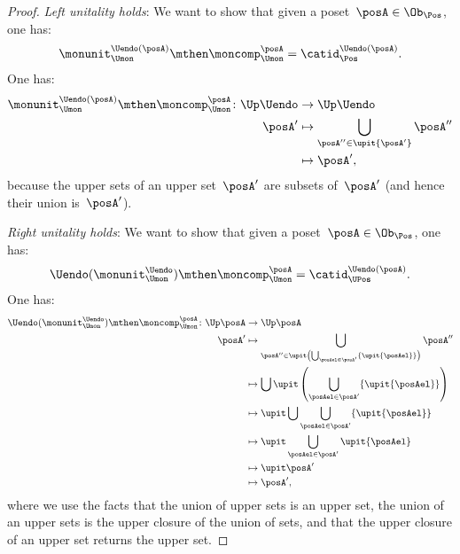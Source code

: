 \begin{proof}
  \emph{Left unitality holds}: We want to show that given a poset~$\posA\in \Ob_\Pos$, one has:
  \begin{equation}
    \monunit_{\Umon}^{\Uendo(\posA)}\mthen \moncomp_{\Umon}^{\posA}=\catid_{\Pos}^{\Uendo(\posA)}.
  \end{equation}
  One has:
  \begin{equation}
  \begin{aligned}
    \monunit_{\Umon}^{\Uendo(\posA)}\mthen \moncomp_{\Umon}^{\posA}\colon \Up \Uendo &\to \Up \Uendo\\
    \posA'&\mapsto \bigcup_{\posA''\in \upit \{ \posA'\}} \posA''\\
    &\mapsto \posA',
  \end{aligned}
  \end{equation}
  because the upper sets of an upper set~$\posA'$ are subsets of~$\posA'$ (and hence their union is~$\posA'$).

  \emph{Right unitality holds}: We want to show that given a poset~$\posA\in \Ob_\Pos$, one has:
  \begin{equation}
    \Uendo(\monunit_{\Umon}^{\Uendo})\mthen \moncomp_{\Umon}^{\posA}=\catid_{\UPos}^{\Uendo(\posA)}.
  \end{equation}
  One has:
  \begin{equation*}
    \begin{aligned}
    \Uendo(\monunit_{\Umon}^{\Uendo})\mthen \moncomp_{\Umon}^{\posA}\colon \Up \posA &\to \Up \posA\\
      \posA'&\mapsto \bigcup_{\posA''\in \upit \left( \bigcup_{\posAel \in \posA'}\{ \upit \{\posAel\}\}\right)}\posA''\\
      &\mapsto \bigcup \upit \left( \bigcup_{\posAel \in \posA'}\{\upit \{ \posAel\} \}\right)\\
      &\mapsto \upit \bigcup   \bigcup_{\posAel \in \posA'}\{\upit \{ \posAel\} \}\\
      &\mapsto \upit \bigcup_{\posAel \in \posA'}\upit \{ \posAel\}\\
      &\mapsto \upit \posA'\\
      &\mapsto \posA',
    \end{aligned}
  \end{equation*}
  where we use the facts that the union of upper sets is an upper set, the union of an upper sets is the upper closure of the union of sets, and that the upper closure of an upper set returns the upper set.


\end{proof}
